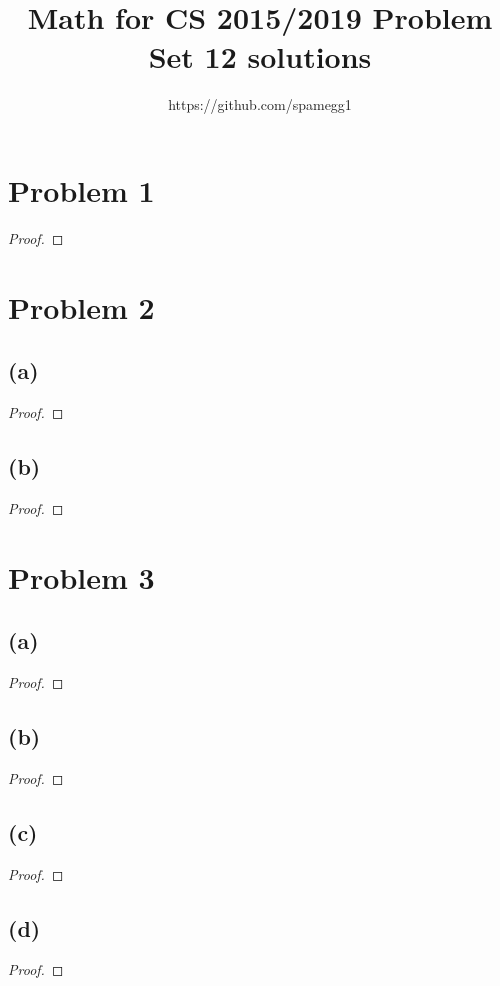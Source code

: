 \documentclass[14pt]{extarticle}
\title{Math for CS 2015/2019 Problem Set 12 solutions}
\author{https://github.com/spamegg1}
\begin{document}
\maketitle
\tableofcontents

\section{Problem 1}

\begin{proof}

\end{proof}

\section{Problem 2}
\subsection{(a)}

\begin{proof}
\end{proof}

\subsection{(b)}
\begin{proof}
\end{proof}

\section{Problem 3}

\subsection{(a)}
\begin{proof}
\end{proof}

\subsection{(b)}
\begin{proof}
\end{proof}

\subsection{(c)}
\begin{proof}
\end{proof}

\subsection{(d)}
\begin{proof}
\end{proof}
\end{document}
